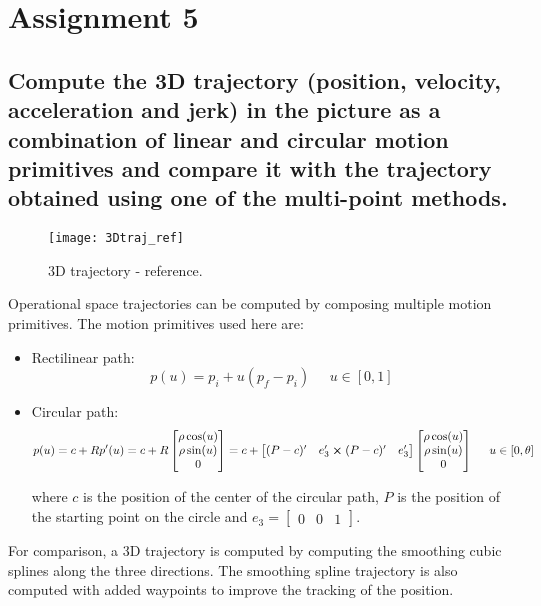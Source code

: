 \section{Assignment 5}

\subsection{Compute the 3D trajectory (position, velocity, acceleration and jerk) in the picture as
a combination of linear and circular motion primitives and compare it with the
trajectory obtained using one of the multi-point methods.}

\begin{figure}[h]
\centering
\texttt{[image: 3Dtraj\_ref]}
\caption{3D trajectory - reference.}
\end{figure}

Operational space trajectories can be computed by composing multiple motion primitives. The motion primitives used here are:

\begin{itemize}
\item Rectilinear path:
\begin{equation*}
p(u)=p_i+u(p_f-p_i)\;\;\;\;\;u\in[0,1]
\end{equation*}
\item Circular path:
\begin{equation*}
p(u)=c+Rp'(u)=c+R\begin{bmatrix}
\rho\cos(u)\\\rho\sin(u)\\
0
\end{bmatrix}=c+\begin{bmatrix}
(P-c)' & e_3'\cross(P-c)' & e_3'
\end{bmatrix}\begin{bmatrix}
\rho\cos(u)\\\rho\sin(u)\\
0
\end{bmatrix}\;\;\;\;\;u\in[0,\theta]
\end{equation*}

where $c$ is the position of the center of the circular path, $P$ is the position of the starting point on the circle and $e_3=\begin{bmatrix}
0 & 0 & 1
\end{bmatrix}$.
\end{itemize}

For comparison, a 3D trajectory is computed by computing the smoothing cubic splines along the three directions. The smoothing spline trajectory is also computed with added waypoints to improve the tracking of the position.

